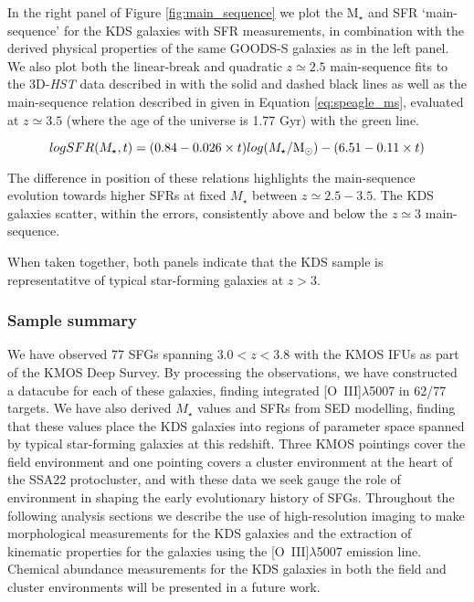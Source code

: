 \documentclass[fleqn,usenatbib]{mnras}
\begin{document}
In the right panel of Figure \ref{fig:main_sequence} we plot the M$_{\star}$ and SFR `main-sequence' for the KDS galaxies with SFR measurements, in combination with the derived physical properties of the same GOODS-S galaxies as in the left panel.
We also plot both the linear-break and quadratic $z\simeq2.5$ main-sequence fits to the 3D-{\em HST} data described in \cite{Whitaker2014} with the solid and dashed black lines as well as the main-sequence relation described in \cite{Speagle2014} given in Equation \ref{eq:speagle_ms}, evaluated at $z\simeq3.5$ (where the age of the universe is 1.77 Gyr) with the green line.

\begin{equation}\label{eq:speagle_ms}
logSFR(M_{\star}, t) = (0.84 - 0.026 \times t)log(M_{\star}/{\rm M}_{\odot}) - (6.51 - 0.11 \times t)
\end{equation}

\noindent
The difference in position of these relations highlights the main-sequence evolution towards higher SFRs at fixed $M_{\star}$ between $z\simeq2.5-3.5$.
The KDS galaxies scatter, within the errors, consistently above and below the $z\simeq3$ main-sequence.

When taken together, both panels indicate that the KDS sample is representatitve of typical star-forming galaxies at $z>3$.

\subsubsection{Sample summary}\label{subsubsec:sample_summary}
We have observed 77 SFGs spanning $3.0 < z < 3.8$ with the KMOS IFUs as part of the KMOS Deep Survey.
By processing the observations, we have constructed a datacube for each of these galaxies, finding integrated [O~{\sc III}]$\lambda$5007 in 62/77 targets.
We have also derived $M_{\star}$ values and SFRs from SED modelling, finding that these values place the KDS galaxies into regions of parameter space spanned by typical star-forming galaxies at this redshift.
Three KMOS pointings cover the field environment and one pointing covers a cluster environment at the heart of the SSA22 protocluster, and with these data we seek gauge the role of environment in shaping the early evolutionary history of SFGs.
Throughout the following analysis sections we describe the use of high-resolution imaging to make morphological measurements for the KDS galaxies and the extraction of kinematic properties for the galaxies using the [O~{\sc III}]$\lambda$5007 emission line.
Chemical abundance measurements for the KDS galaxies in both the field and cluster environments will be presented in a future work.
\end{document}
